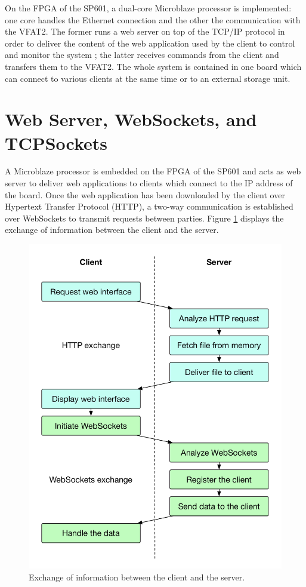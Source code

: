     On the FPGA of the SP601, a dual-core Microblaze processor is implemented: one core handles the Ethernet connection and the other the communication with the VFAT2. The former runs a web server on top of the TCP/IP protocol in order to deliver the content of the web application used by the client to control and monitor the system ; the latter receives commands from the client and transfers them to the VFAT2. The whole system is contained in one board which can connect to various clients at the same time or to an external storage unit.

  \section{Web Server, WebSockets, and TCPSockets}

    A Microblaze processor is embedded on the FPGA of the SP601 and acts as web server to deliver web applications to clients which connect to the IP address of the board. Once the web application has been downloaded by the client over Hypertext Transfer Protocol (HTTP), a two-way communication is established over WebSockets to transmit requests between parties. Figure \ref{fig:III-2-flow} displays the exchange of information between the client and the server.

    \begin{figure}[p!]
      \centering
      \includegraphics[width=\textwidth]{img/III-2-web-daq/flow}
      \caption{Exchange of information between the client and the server.}
      \label{fig:III-2-flow}
    \end{figure}

